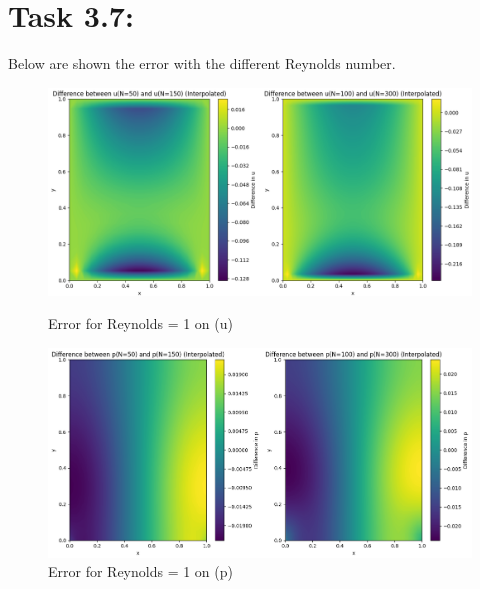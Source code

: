 \documentclass{article}
\begin{document}
\section*{\Large Task 3.7:}
Below are shown the error with the different Reynolds number.
\begin{figure}[h!]
  \centering
  \begin{minipage}{0.49\textwidth}
    \centering
    \includegraphics[width=\textwidth]{udiff1.png}
    \caption{Error for Reynolds = 1 on (u)}
  \end{minipage}
  \hfill
  \begin{minipage}{0.49\textwidth}
    \centering
    \includegraphics[width=\textwidth]{pdiff1.png}
    \caption{Error for Reynolds = 1 on (p)}
  \end{minipage}
\end{figure}
\end{document}
